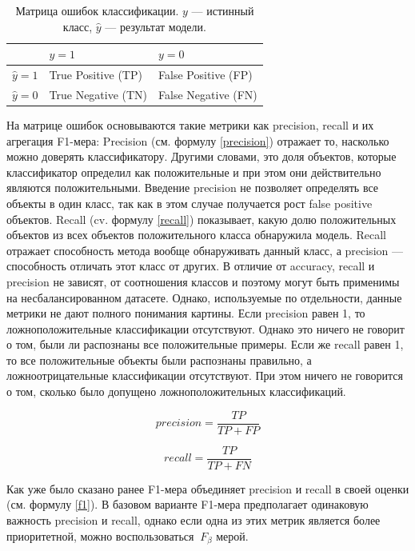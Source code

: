 \documentclass[a4paper,12pt]{extarticle}
\begin{document}
\begin{table}[h]
	\centering
	\begin{tabular}{ | l | l | l | }
		\hline
		& $y = 1$ & $y = 0$ \\ \hline
		$\hat{y} = 1$ & True Positive (TP) & False Positive (FP) \\ \hline
		$\hat{y} = 0$ & True Negative (TN) & False Negative (FN) \\ \hline
	\end{tabular}
	\caption{Матрица ошибок классификации.
		$y$ — истинный класс, $\hat{y}$ — результат модели.}
	\label{confusion_matr}
\end{table}

На матрице ошибок основываются такие метрики как precision, recall и их агрегация F1-мера: Precision (см. формулу \ref{precision}) отражает то, насколько можно доверять классификатору. Другими словами, это доля объектов, которые классификатор определил как положительные и при этом они действительно являются положительными. Введение precision не позволяет определять все объекты в один класс, так как в этом случае получается рост false positive объектов. Recall (cv. формулу \ref{recall}) показывает, какую долю положительных объектов из всех объектов положительного класса обнаружила модель. Recall отражает способность метода вообще обнаруживать данный класс, а precision — способность отличать этот класс от других. В отличие от accuracy, recall и precision не зависят, от соотношения классов и поэтому могут быть применимы на несбалансированном датасете. Однако, используемые по отдельности, данные метрики не дают полного понимания картины. Если precision равен 1, то ложноположительные классификации отсутствуют. Однако это ничего не говорит о том, были ли распознаны все положительные примеры. Если же recall равен 1, то все положительные объекты были распознаны правильно, а ложноотрицательные классификации отсутствуют. При этом ничего не говорится о том, сколько было допущено ложноположительных классификаций.

\begin{equation}
	\label{precision}
	precision = \frac{TP}{TP + FP}
\end{equation}

\begin{equation}
	\label{recall}
	recall = \frac{TP}{TP + FN}
\end{equation}


Как уже было сказано ранее F1-мера объединяет precision и recall в своей оценки (см. формулу \ref{f1}). В базовом варианте F1-мера предполагает одинаковую важность precision и recall, однако если одна из этих метрик является более приоритетной, можно воспользоваться $\ F_\beta$ мерой.
\end{document}
